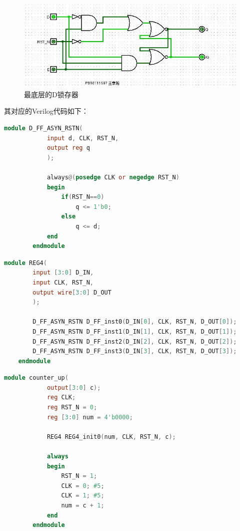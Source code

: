 \documentclass[UTF8]{article}
\begin{document}
	\begin{figure}[H]
		\centering
		\includegraphics[width=1\linewidth]{e3_D_Letch.jpg}
		\caption{最底层的D锁存器}
		\label{e3_D_Letch}
	\end{figure}

	其对应的Verilog代码如下：
	\begin{lstlisting}[language = Verilog, name=D触发器]
		module D_FF_ASYN_RSTN(
			input d, CLK, RST_N,
			output reg q
			);
			
			always@(posedge CLK or negedge RST_N)
			begin
				if(RST_N==0)
					q <= 1'b0;
				else
					q <= d;
			end
		endmodule
	\end{lstlisting}
	
	
	\begin{lstlisting}[language = Verilog, name=4bit寄存器]
	module REG4(
		input [3:0] D_IN,
		input CLK, RST_N,
		output wire[3:0] D_OUT
		);
		
		D_FF_ASYN_RSTN D_FF_inst0(D_IN[0], CLK, RST_N, D_OUT[0]);
		D_FF_ASYN_RSTN D_FF_inst1(D_IN[1], CLK, RST_N, D_OUT[1]);
		D_FF_ASYN_RSTN D_FF_inst2(D_IN[2], CLK, RST_N, D_OUT[2]);
		D_FF_ASYN_RSTN D_FF_inst3(D_IN[3], CLK, RST_N, D_OUT[3]);
	endmodule
	\end{lstlisting}
	
	\begin{lstlisting}[language = Verilog, name=向上0到15计数]
		module counter_up(
			output[3:0] c);
			reg CLK;
			reg RST_N = 0;
			reg [3:0] num = 4'b0000;
			
			REG4 REG4_init0(num, CLK, RST_N, c);
			
			always
			begin
				RST_N = 1;
				CLK = 0; #5; 
				CLK = 1; #5;
				num = c + 1;
			end
		endmodule
	\end{lstlisting}
\end{document}
